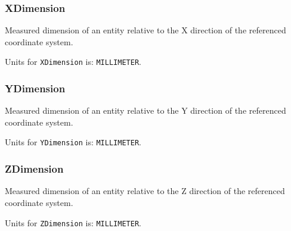 \subsubsection{XDimension}
  \label{sec:XDimension}


Measured dimension of an entity relative to the X direction of the referenced coordinate system.


Units for \texttt{XDimension} is: \texttt{MILLIMETER}.

\FloatBarrier

\subsubsection{YDimension}
  \label{sec:YDimension}


Measured dimension of an entity relative to the Y direction of the referenced coordinate system.


Units for \texttt{YDimension} is: \texttt{MILLIMETER}.

\FloatBarrier

\subsubsection{ZDimension}
  \label{sec:ZDimension}


Measured dimension of an entity relative to the Z direction of the referenced coordinate system.


Units for \texttt{ZDimension} is: \texttt{MILLIMETER}.

\FloatBarrier
